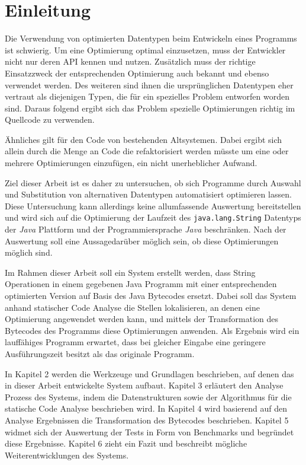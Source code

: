 \chapter{Einleitung}

Die Verwendung von optimierten Datentypen beim Entwickeln eines Programms ist schwierig. 
Um eine Optimierung optimal einzusetzen, muss der Entwickler nicht nur deren API  
kennen und nutzen. Zusätzlich muss der richtige Einsatzzweck der entsprechenden
Optimierung auch bekannt und ebenso verwendet werden. Des weiteren sind ihnen die 
ursprünglichen Datentypen eher vertraut als diejenigen Typen, die für ein spezielles 
Problem entworfen worden sind. Daraus folgend ergibt sich das Problem spezielle 
Optimierungen richtig im Quellcode zu verwenden. 

Ähnliches gilt für den Code von bestehenden Altsystemen. Dabei ergibt sich allein 
durch die Menge an Code die refaktorisiert werden müsste um eine oder mehrere
Optimierungen einzufügen, ein nicht unerheblicher Aufwand.

Ziel dieser Arbeit ist es daher zu untersuchen, ob sich Programme durch Auswahl und 
Substitution von alternativen Datentypen automatisiert optimieren lassen. Diese 
Untersuchung kann allerdings keine allumfassende Auswertung bereitstellen und wird 
sich auf die Optimierung der Laufzeit des \texttt{java.lang.String} Datentyps der 
\textit{Java} Plattform und der Programmiersprache \textit{Java} beschränken. Nach 
der Auswertung soll eine Aussagedarüber möglich sein, ob diese Optimierungen möglich sind.

Im Rahmen dieser Arbeit soll ein System erstellt werden, dass String Operationen in einem
gegebenen Java Programm mit einer entsprechenden optimierten Version auf Basis des 
Java Bytecodes ersetzt. Dabei soll das System anhand statischer Code Analyse die Stellen
lokalisieren, an denen eine Optimierung angewendet werden kann, und mittels der Transformation des 
Bytecodes des Programms diese Optimierungen anwenden. Als Ergebnis wird ein lauffähiges
Programm erwartet, dass bei gleicher Eingabe eine geringere Ausführungszeit besitzt 
als das originale Programm.

In Kapitel 2 werden die Werkzeuge und Grundlagen beschrieben, auf denen das in dieser Arbeit
entwickelte System aufbaut. Kapitel 3 erläutert den Analyse Prozess des Systems, indem
die Datenstrukturen sowie der Algorithmus für die statische Code Analyse beschrieben wird.
In Kapitel 4 wird basierend auf den Analyse Ergebnissen die Transformation des Bytecodes 
beschrieben. Kapitel 5 widmet sich der Auswertung der Tests in Form von Benchmarks
und begründet diese Ergebnisse. Kapitel 6 zieht ein Fazit und beschreibt mögliche
Weiterentwicklungen des Systems.    